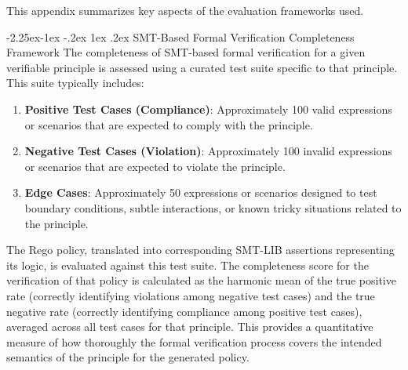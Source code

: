 \documentclass[manuscript,screen,review,anonymous,9pt]{acmart}
\makeatletter
\renewcommand\subsection{\@startsection{subsection}{2}{\z@}%
  {-2.25ex\@plus -1ex \@minus -.2ex}%
  {1ex \@plus .2ex}%
  {\normalfont\large\bfseries}}
\makeatother
\begin{document}
This appendix summarizes key aspects of the evaluation frameworks used.

\subsection{SMT-Based Formal Verification Completeness Framework}
The completeness of SMT-based formal verification for a given verifiable principle is assessed using a curated test suite specific to that principle. This suite typically includes:
\begin{enumerate}[leftmargin=*,itemsep=1pt,parsep=1pt]
    \item \textbf{Positive Test Cases (Compliance)}: Approximately 100 valid expressions or scenarios that are expected to comply with the principle.
    \item \textbf{Negative Test Cases (Violation)}: Approximately 100 invalid expressions or scenarios that are expected to violate the principle.
    \item \textbf{Edge Cases}: Approximately 50 expressions or scenarios designed to test boundary conditions, subtle interactions, or known tricky situations related to the principle.
\end{enumerate}
The Rego policy, translated into corresponding SMT-LIB assertions representing its logic, is evaluated against this test suite. The completeness score for the verification of that policy is calculated as the harmonic mean of the true positive rate (correctly identifying violations among negative test cases) and the true negative rate (correctly identifying compliance among positive test cases), averaged across all test cases for that principle. This provides a quantitative measure of how thoroughly the formal verification process covers the intended semantics of the principle for the generated policy.
\end{document}
